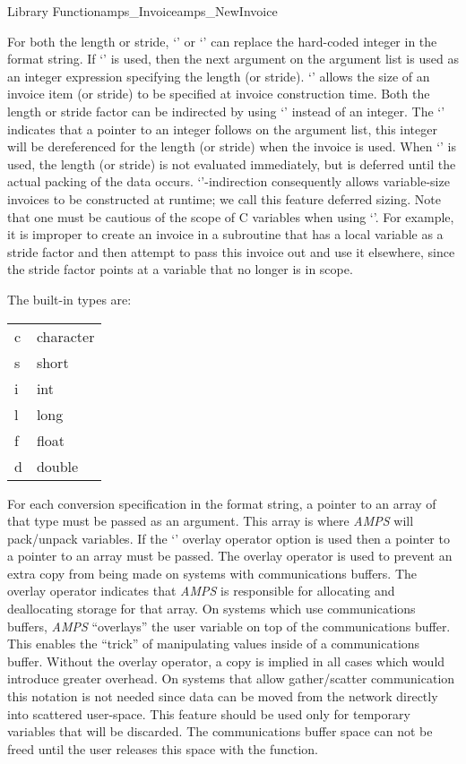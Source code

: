 \begin{deftypefn}{Library Function}{amps_Invoice}{amps\_NewInvoice}
{For both the length or stride, `\code{*}' or `\code{&}' can replace
the hard-coded integer in the format string.  If `\code{*}' is used,
then the next argument on the argument list is used as an integer
expression specifying the length (or stride).  `\code{*}' allows the
size of an invoice item (or stride) to be specified at invoice
construction time.  Both the length or stride factor can be indirected
by using `\code{&}' instead of an integer.  The `\code{&}' indicates
that a pointer to an integer follows on the argument list, this
integer will be dereferenced for the length (or stride) when the
invoice is used.  When `\code{&}' is used, the length (or stride) is
not evaluated immediately, but is deferred until the actual packing of
the data occurs.  `\code{&}'-indirection consequently allows
variable-size invoices to be constructed at runtime; we call this
feature deferred sizing.  Note that one must be cautious of the scope
of C variables when using `\code{&}'.  For example, it is improper to
create an invoice in a subroutine that has a local variable as a
stride factor and then attempt to pass this invoice out and use it
elsewhere, since the stride factor points at a variable that no longer
is in scope.

The built-in types are:

\begin{tabular}{ll}
c & character \\
s & short \\
i & int \\
l & long \\
f & float \\
d & double
\end{tabular}

For each conversion specification in the format string, a pointer to an
array of that type must be passed as an argument.  This array is where
{\em AMPS} will pack/unpack variables.  If the `' overlay
operator option is used then a pointer to a pointer to an array must be
passed.  The overlay operator is used to prevent an extra copy from
being made on systems with communications buffers.  The overlay operator
indicates that {\em AMPS} is responsible for allocating and
deallocating storage for that array.  On systems which use
communications buffers, {\em AMPS} ``overlays'' the user variable on
top of the communications buffer.  This enables the ``trick'' of
manipulating values inside of a communications buffer.  Without the
overlay operator, a copy is implied in all cases which would introduce
greater overhead.  On systems that allow gather/scatter communication
this notation is not needed since data can be moved from the network
directly into scattered user-space.  This feature should be used only
for temporary variables that will be discarded.  The communications
buffer space can not be freed until the user releases this space with
the  function.

}
\end{deftypefn}
